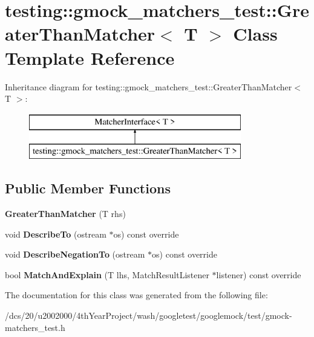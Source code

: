 \hypertarget{classtesting_1_1gmock__matchers__test_1_1GreaterThanMatcher}{}\section{testing\+:\+:gmock\+\_\+matchers\+\_\+test\+:\+:Greater\+Than\+Matcher$<$ T $>$ Class Template Reference}
\label{classtesting_1_1gmock__matchers__test_1_1GreaterThanMatcher}
Inheritance diagram for testing\+:\+:gmock\+\_\+matchers\+\_\+test\+:\+:Greater\+Than\+Matcher$<$ T $>$\+:\begin{figure}[H]
\begin{center}
\leavevmode
\includegraphics[height=2.000000cm]{classtesting_1_1gmock__matchers__test_1_1GreaterThanMatcher}
\end{center}
\end{figure}
\subsection*{Public Member Functions}
\begin{DoxyCompactItemize}
\item 
\mbox{\label{classtesting_1_1gmock__matchers__test_1_1GreaterThanMatcher_af06b6ed514af34080c9ffc8c9a78e9f9}} 
{\bfseries Greater\+Than\+Matcher} (T rhs)
\item 
\mbox{\label{classtesting_1_1gmock__matchers__test_1_1GreaterThanMatcher_a11873f311fab1a3ac7a99f5203367c6d}} 
void {\bfseries Describe\+To} (ostream $\ast$os) const override
\item 
\mbox{\label{classtesting_1_1gmock__matchers__test_1_1GreaterThanMatcher_a98f817b955a8de0552fcc7784d3175f7}} 
void {\bfseries Describe\+Negation\+To} (ostream $\ast$os) const override
\item 
\mbox{\label{classtesting_1_1gmock__matchers__test_1_1GreaterThanMatcher_a170507a0d249714295816c17cfa69b0c}} 
bool {\bfseries Match\+And\+Explain} (T lhs, Match\+Result\+Listener $\ast$listener) const override
\end{DoxyCompactItemize}


The documentation for this class was generated from the following file\+:\begin{DoxyCompactItemize}
\item 
/dcs/20/u2002000/4th\+Year\+Project/wash/googletest/googlemock/test/gmock-\/matchers\+\_\+test.\+h\end{DoxyCompactItemize}
